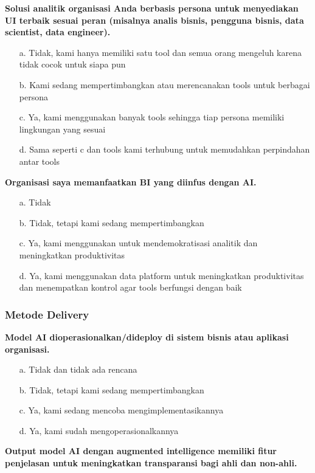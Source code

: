 \documentclass{article}
\begin{document}
\textbf{Solusi analitik organisasi Anda berbasis persona untuk menyediakan UI terbaik sesuai peran (misalnya analis bisnis, pengguna bisnis, data scientist, data engineer).}

\begin{enumerate}
	\item[a.] Tidak, kami hanya memiliki satu tool dan semua orang mengeluh karena tidak cocok untuk siapa pun
	\item[b.] Kami sedang mempertimbangkan atau merencanakan tools untuk berbagai persona
	\item[c.] Ya, kami menggunakan banyak tools sehingga tiap persona memiliki lingkungan yang sesuai
	\item[d.] Sama seperti c dan tools kami terhubung untuk memudahkan perpindahan antar tools
\end{enumerate}

\textbf{Organisasi saya memanfaatkan BI yang diinfus dengan AI.}

\begin{enumerate}
	\item[a.] Tidak
	\item[b.] Tidak, tetapi kami sedang mempertimbangkan
	\item[c.] Ya, kami menggunakan untuk mendemokratisasi analitik dan meningkatkan produktivitas
	\item[d.] Ya, kami menggunakan data platform untuk meningkatkan produktivitas dan menempatkan kontrol agar tools berfungsi dengan baik
\end{enumerate}

\subsubsection{Metode Delivery}

\textbf{Model AI dioperasionalkan/dideploy di sistem bisnis atau aplikasi organisasi.}

\begin{enumerate}
	\item[a.] Tidak dan tidak ada rencana
	\item[b.] Tidak, tetapi kami sedang mempertimbangkan
	\item[c.] Ya, kami sedang mencoba mengimplementasikannya
	\item[d.] Ya, kami sudah mengoperasionalkannya
\end{enumerate}

\textbf{Output model AI dengan augmented intelligence memiliki fitur penjelasan untuk meningkatkan transparansi bagi ahli dan non-ahli.}
\end{document}
